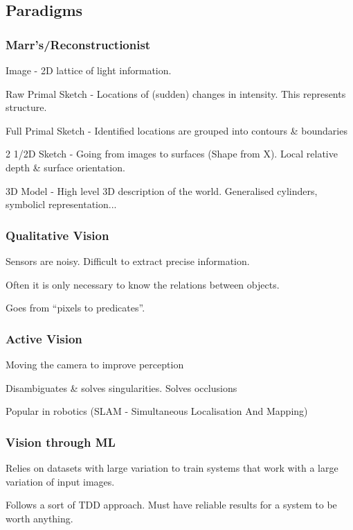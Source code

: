 \documentclass[8pt]{extarticle}
\begin{document}
\begin{multicols}{2}
\subsection{Paradigms}
\subsubsection{Marr's/Reconstructionist}
\begin{compactitem}
    \item Image - 2D lattice of light information.
    \item Raw Primal Sketch - Locations of (sudden) changes in intensity. This represents structure.
    \item Full Primal Sketch - Identified locations are grouped into contours \& boundaries
    \item 2 1/2D Sketch - Going from images to surfaces (Shape from X). Local relative depth \& surface orientation.
    \item 3D Model - High level 3D description of the world. Generalised cylinders, symbolicl representation...
\end{compactitem}

\subsubsection{Qualitative Vision}
\begin{compactitem}
    \item Sensors are noisy. Difficult to extract precise information.
    \item Often it is only necessary to know the relations between objects.
    \item Goes from ``pixels to predicates''.
\end{compactitem}

\subsubsection{Active Vision}
\begin{compactitem}
    \item Moving the camera to improve perception
    \item Disambiguates \& solves singularities. Solves occlusions
    \item Popular in robotics (SLAM - Simultaneous Localisation And Mapping)
\end{compactitem}

\subsubsection{Vision through ML}
\begin{compactitem}
    \item Relies on datasets with large variation to train systems that work with a large variation of input images.
    \item Follows a sort of TDD approach. Must have reliable results for a system to be worth anything.
\end{compactitem}



\end{multicols}
\end{document}
